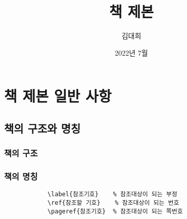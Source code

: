 \documentclass[12pt, a4paper, oneside]{book}
\newcommand{\SectionMargin}			{\newpage  \null \vskip 2cm}
\begin{document}
	
			\dominitoc
			

			\title{책 제본}
			\author{김대희}
			\date{2022년 7월}
			\maketitle


			\tableofcontents
			\listoffigures
			\listoftables

			



		\part{책 제본 일반 사항}

	\newpage
	\chapter{책의 구조와 명칭}


		\newpage
		\minitoc				%


	\newpage  \null
	\section{책의 구조}






	\SectionMargin
	\section{책의 명칭}


		\begin{verbatim}
			\label{참조기호}	% 참조대상이 되는 부정
			\ref{참조할 기호}	% 참조대상이 되는 번호
			\pageref{참조기호}	% 참조대상이 되는 쪽번호
		\end{verbatim}



	\newpage
\end{document}
